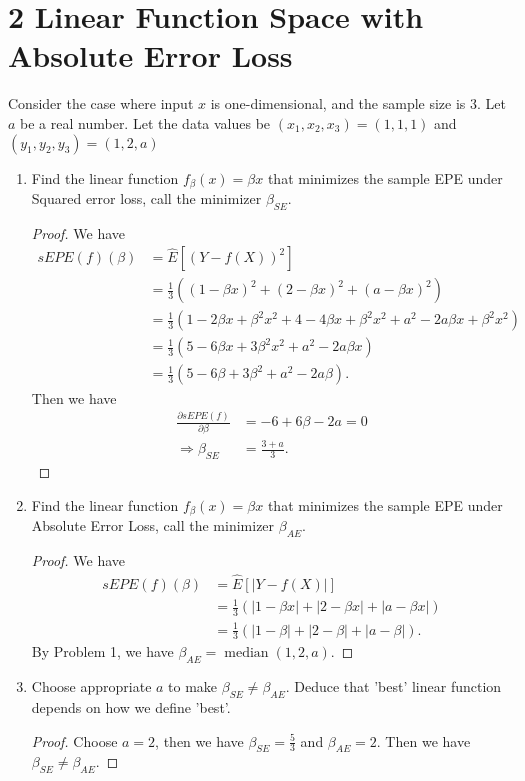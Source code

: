 \documentclass[10pt]{article}
\begin{document}
\section*{2 Linear Function Space with Absolute Error Loss}
Consider the case where input $x$ is one-dimensional, and the sample size is 3. Let $a$ be a real number. Let the data values be $\left(x_{1}, x_{2}, x_{3}\right)=(1,1,1)$ and $\left(y_{1}, y_{2}, y_{3}\right)=(1,2, a)$

\begin{enumerate}
  \item Find the linear function $f_{\beta}(x)=\beta x$ that minimizes the sample EPE under Squared error loss, call the minimizer $\beta_{S E}$.
  \begin{proof}
    We have 
    \begin{align*}
      sEPE(f)(\beta)&=\hat{E}\left[(Y-f(X))^2\right]\\
      &=\frac{1}{3}\left( (1-\beta x)^2 +(2-\beta x)^2+(a-\beta x)^2 \right)\\
      &=\frac{1}{3}\left( 1-2\beta x+\beta^2x^2 +4-4\beta x+\beta^2x^2+a^2-2a\beta x+\beta^2x^2 \right)\\
      &=\frac{1}{3}\left( 5-6\beta x+3\beta^2x^2 +a^2-2a\beta x \right)\\
      &=\frac{1}{3}\left( 5-6\beta+3\beta^2 +a^2-2a\beta \right).
    \end{align*}
    Then we have
    \begin{align*}
      \frac{\partial sEPE(f)}{\partial \beta}&=-6+6\beta-2a=0\\
      \Rightarrow \beta_{SE}&=\frac{3+a}{3}.
    \end{align*}

  \end{proof}

  \item Find the linear function $f_{\beta}(x)=\beta x$ that minimizes the sample EPE under Absolute Error Loss, call the minimizer $\beta_{A E}$.
  \begin{proof}
    We have 
  \begin{align*}
    sEPE(f)(\beta)&=\hat{E}\left[|Y-f(X)|\right]\\
    &=\frac{1}{3}\left( |1-\beta x| +|2-\beta x|+|a-\beta x| \right)\\
    &=\frac{1}{3}\left( |1-\beta| +|2-\beta|+|a-\beta| \right).
  \end{align*}
  By Problem 1, we have $\beta_{AE}=\operatorname{median}(1,2,a)$.

  \end{proof}
  \item Choose appropriate $a$ to make $\beta_{S E} \neq \beta_{A E}$. Deduce that 'best' linear function depends on how we define 'best'.
  \begin{proof}
    Choose $a=2$, then we have $\beta_{SE}=\frac{5}{3}$ and $\beta_{AE}=2$. Then we have $\beta_{SE} \neq \beta_{AE}$.
  \end{proof}

\end{enumerate}
\end{document}
